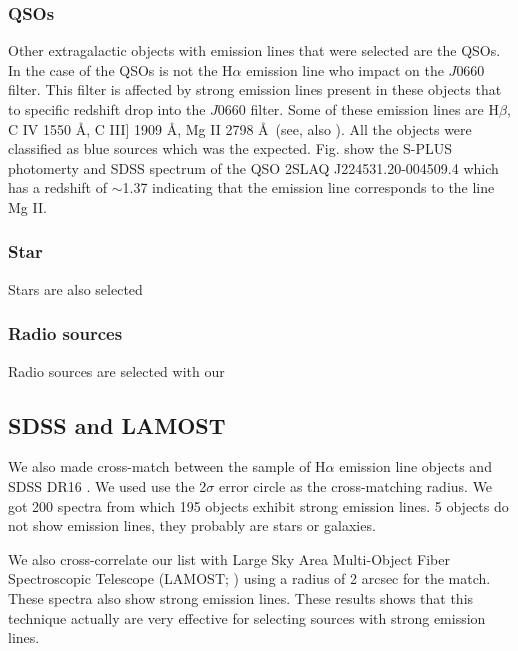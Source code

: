 \documentclass[fleqn,usenatbib]{mnras}
\begin{document}
{\subsubsection{QSOs}
Other extragalactic objects with emission lines that were selected are the
QSOs. In the case of the QSOs is not the H{$\alpha$} emission line who impact
on the $J$0660 filter. This filter is affected by strong emission lines present in
these objects that to specific redshift drop into the $J$0660 filter.
Some of these emission lines are H{$\beta$}, C {\sc IV} 1550 \AA, C {\sc III]} 1909 \AA,
  Mg {\sc II} 2798 \AA~(see, also \citealp{Gutierrez:2020, Nakazono:2021}).
  All the objects were classified as blue sources which was the expected.
  Fig. show the S-PLUS photomerty and SDSS spectrum of the QSO 2SLAQ J224531.20-004509.4
  which has a redshift of $\sim$1.37 indicating that the emission line corresponds to
  the line Mg {\sc II}.
  

\subsubsection{Star}
Stars are also selected 

\subsubsection{Radio sources}
Radio sources are selected with our

\subsection{SDSS and LAMOST}

We also made cross-match between the sample of H{$\alpha$} emission line objects and SDSS DR16
\citep{Ahumada:2020}. We used use the 2$\sigma$ error circle as the cross-matching radius.
We got 200 spectra from which 195 objects exhibit strong emission lines. 5 objects do not show
emission lines, they probably are stars or galaxies.

We also cross-correlate our list with Large Sky Area Multi-Object Fiber Spectroscopic Telescope
(LAMOST; \citealp{Wu:2011}) using a radius of 2 arcsec for the match.  These spectra also
show strong emission lines. These results shows that this technique actually are very effective
for selecting sources with strong emission lines.


}
\end{document}
